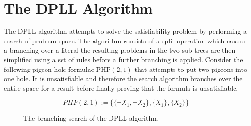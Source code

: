 \section{The DPLL Algorithm}
The DPLL algorithm attempts to solve the satisfiability problem by performing a search of problem space. The algorithm consists of a split operation which causes a branching over a literal the resulting problems in the two sub trees are then simplified using a set of rules before a further branching is applied. Consider the following pigeon hole formulae $\mathrm{PHP}(2,1)$ that attempts to put two pigeons into one hole. It is unsatisfiable and therefore the search algorithm branches over the entire space for a result before finally proving that the formula is unsatisfiable.

$$PHP(2,1) := \{\{\neg X_1, \neg X_2\}, \{ X_1 \}, \{ X_2 \} \}$$


\bigskip
\begin{figure}[h!]
\begin{center}
\end{center}
\caption{The branching search of the DPLL algorithm}
\end{figure}
\bigskip

